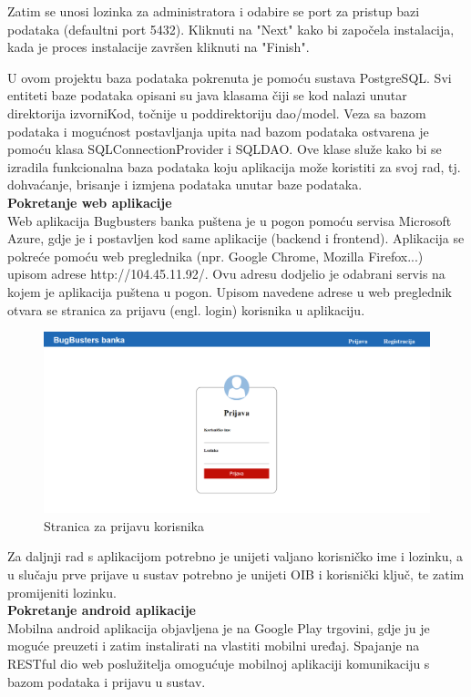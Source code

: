 			Zatim se unosi lozinka za administratora i odabire se port za pristup bazi podataka (defaultni port 5432). Kliknuti na "Next" kako bi započela instalacija, kada je proces instalacije završen kliknuti na "Finish".
			
			 U ovom projektu baza podataka pokrenuta je pomoću sustava PostgreSQL. Svi entiteti baze podataka opisani su java klasama čiji se kod nalazi unutar direktorija izvorniKod, točnije u poddirektoriju dao/model. Veza sa bazom podataka i mogućnost postavljanja upita nad bazom podataka ostvarena je pomoću klasa SQLConnectionProvider i SQLDAO. Ove klase služe kako bi se izradila funkcionalna baza podataka koju aplikacija može koristiti za svoj rad, tj. dohvaćanje, brisanje i izmjena podataka unutar baze podataka.
			 \\	
			 
			\textbf{Pokretanje web aplikacije}
			\\		
	
			
			Web aplikacija Bugbusters banka puštena je u pogon pomoću servisa Microsoft Azure, gdje je i postavljen kod same aplikacije (backend i frontend). Aplikacija se pokreće pomoću web preglednika (npr. Google Chrome, Mozilla Firefox...) upisom adrese http://104.45.11.92/. Ovu adresu dodjelio je odabrani servis na kojem je aplikacija puštena u pogon. Upisom navedene adrese u web preglednik otvara se stranica za prijavu (engl. login) korisnika u aplikaciju. 
			
			\begin{figure}[H]
				\includegraphics[scale=0.3]{Slike/login.png}
				\centering
				\caption{Stranica za prijavu korisnika}
				\label{fig:dijagram}
			\end{figure}
			
			
			Za daljnji rad s aplikacijom potrebno je unijeti valjano korisničko ime i lozinku, a u slučaju prve prijave u sustav potrebno je unijeti OIB i korisnički ključ, te zatim promijeniti lozinku.
		\\	
			
		\textbf{Pokretanje android aplikacije}
		\\
		
		 Mobilna android aplikacija objavljena je na Google Play trgovini, gdje ju je moguće preuzeti i zatim instalirati na vlastiti mobilni uređaj. Spajanje na RESTful dio web poslužitelja omogućuje mobilnoj aplikaciji komunikaciju s bazom podataka i prijavu u sustav.
